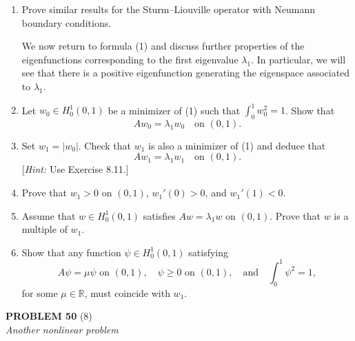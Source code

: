 \documentclass[12pt]{article}
\newcommand{\abs}[1]{\left|#1\right|}
\newcommand{\R}{\mathbb{R}}
\begin{document}
\begin{enumerate}
\item Prove similar results for the Sturm--Liouville operator with Neumann boundary
conditions.
 
We now return to formula (1) and discuss further properties of the eigenfunctions
corresponding to the first eigenvalue $\lambda_1$. In particular, we will see that there is
a positive eigenfunction generating the eigenspace associated to $\lambda_1$.
 
\item Let $w_0 \in H^1_0(0,1)$ be a minimizer of (1) such that $\int_0^1 w_0^2 = 1$. Show that
\[
Aw_0 = \lambda_1 w_0 \quad \text{on } (0,1).
\]
 
\item Set $w_1 = \abs{w_0}$. Check that $w_1$ is also a minimizer of (1) and deduce that
\begin{equation}\tag{2}
Aw_1 = \lambda_1 w_1 \quad \text{on } (0,1).
\end{equation}
[\textit{Hint:} Use Exercise 8.11.]
 
\item Prove that $w_1 > 0$ on $(0,1)$, $w_1'(0) > 0$, and $w_1'(1) < 0$.
 
 
\item Assume that $w \in H^1_0(0,1)$ satisfies $Aw = \lambda_1 w$ on $(0,1)$.
Prove that $w$ is a multiple of $w_1$.
 
 
\item Show that any function $\psi \in H^1_0(0,1)$ satisfying
\[
A\psi = \mu\psi \text{ on } (0,1),\quad \psi \ge 0 \text{ on } (0,1), \quad \text{and} \quad \int_0^1 \psi^2 = 1,
\]
for some $\mu \in \R$, must coincide with $w_1$.
 
\noindent[\textit{Hint:} If $\mu \neq \lambda_1$, check that $\int_0^1 \psi w_1 = 0$. Deduce that $\mu = \lambda_1$.]
\end{enumerate}
 
\bigskip
 
\noindent\textbf{PROBLEM 50} (8)\\[4pt]
\textit{Another nonlinear problem}
 
\end{document}
